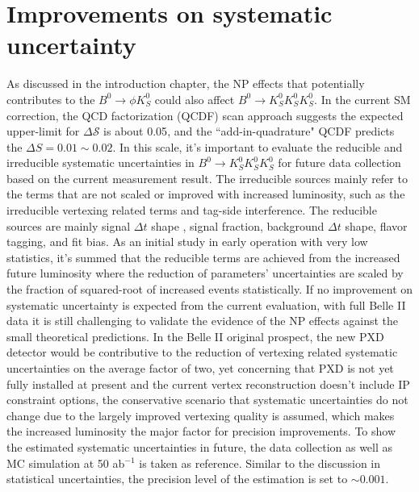 \section{Improvements on systematic uncertainty}
As discussed in the introduction chapter, the NP effects that potentially contributes to the $B^0\to \phi K_S^0$ could also affect $B^0 \to K_S^0  K_S^0  K_S^0$. In the current SM correction, the QCD factorization (QCDF) scan approach suggests the expected upper-limit for $\Delta \mathcal{S}$ is about 0.05\cite{b2book}, and the ``add-in-quadrature" QCDF predicts the $\Delta S = 0.01 \sim 0.02$\cite{b2book}. In this scale, it's important to evaluate the reducible and irreducible systematic uncertainties in $B^0 \to K_S^0  K_S^0  K_S^0$ for future data collection based on the current measurement result. 
The irreducible sources mainly refer to the terms that are not scaled or improved with increased luminosity, such as the irreducible vertexing related terms and tag-side interference. The reducible sources are mainly signal $\Delta t$ shape , signal fraction, background $\Delta t$ shape, flavor tagging, and fit bias. As an initial study in early operation with very low statistics, it's summed that the reducible terms are achieved from the increased future luminosity where the reduction of parameters' uncertainties are scaled by the fraction of squared-root of increased events statistically. If no improvement on systematic uncertainty is expected from the current evaluation, with full Belle II data it is still challenging to validate the evidence of the NP effects against the small theoretical predictions. In the Belle II original prospect, the new PXD detector would be contributive to the reduction of vertexing related systematic uncertainties on the average factor of two\cite{b2book}, yet concerning that PXD is not yet fully installed at present and the current vertex reconstruction doesn't include IP constraint options, the conservative scenario that systematic uncertainties do not change due to the largely improved vertexing quality is assumed, which makes the increased luminosity the major factor for precision improvements. To show the estimated systematic uncertainties in future, the data collection as well as MC simulation at 50 ab$^{-1}$ is taken as reference. Similar to the discussion in statistical uncertainties, the precision level of the estimation is set to $\sim 0.001$.

